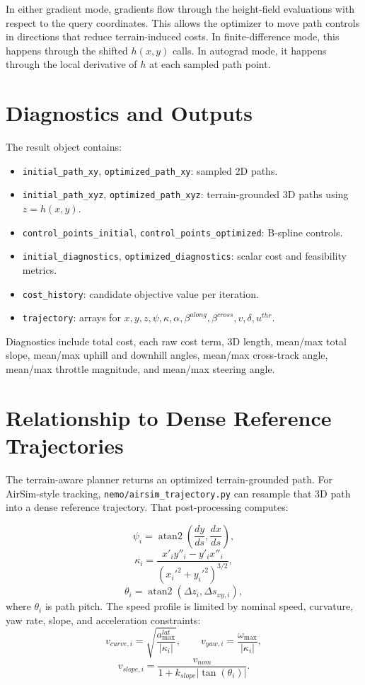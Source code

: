 \documentclass[11pt]{article}
\begin{document}
In either gradient mode, gradients flow through the height-field evaluations with respect to the query coordinates. This allows the optimizer to move path controls in directions that reduce terrain-induced costs. In finite-difference mode, this happens through the shifted \(h(x,y)\) calls. In autograd mode, it happens through the local derivative of \(h\) at each sampled path point.

\section{Diagnostics and Outputs}

The result object contains:

\begin{itemize}[leftmargin=*]
  \item \texttt{initial\_path\_xy}, \texttt{optimized\_path\_xy}: sampled 2D paths.
  \item \texttt{initial\_path\_xyz}, \texttt{optimized\_path\_xyz}: terrain-grounded 3D paths using \(z=h(x,y)\).
  \item \texttt{control\_points\_initial}, \texttt{control\_points\_optimized}: B-spline controls.
  \item \texttt{initial\_diagnostics}, \texttt{optimized\_diagnostics}: scalar cost and feasibility metrics.
  \item \texttt{cost\_history}: candidate objective value per iteration.
  \item \texttt{trajectory}: arrays for \(x,y,z,\psi,\kappa,\alpha,\beta^{along},\beta^{cross},v,\delta,u^{thr}\).
\end{itemize}

Diagnostics include total cost, each raw cost term, 3D length, mean/max total slope, mean/max uphill and downhill angles, mean/max cross-track angle, mean/max throttle magnitude, and mean/max steering angle.

\section{Relationship to Dense Reference Trajectories}

The terrain-aware planner returns an optimized terrain-grounded path. For AirSim-style tracking, \texttt{nemo/airsim\_trajectory.py} can resample that 3D path into a dense reference trajectory. That post-processing computes:

\[
  \psi_i = \operatorname{atan2}\left(\frac{dy}{ds}, \frac{dx}{ds}\right),
\]
\[
  \kappa_i =
  \frac{x'_i y''_i-y'_i x''_i}{(x_i'^2+y_i'^2)^{3/2}},
\]
\[
  \theta_i = \operatorname{atan2}(\Delta z_i,\Delta s_{xy,i}),
\]
where \(\theta_i\) is path pitch. The speed profile is limited by nominal speed, curvature, yaw rate, slope, and acceleration constraints:
\[
  v_{curve,i} = \sqrt{\frac{a^{lat}_{\max}}{|\kappa_i|}},
  \qquad
  v_{yaw,i} = \frac{\omega_{\max}}{|\kappa_i|},
\]
\[
  v_{slope,i} =
  \frac{v_{nom}}{1+k_{slope}|\tan(\theta_i)|}.
\]
\end{document}
